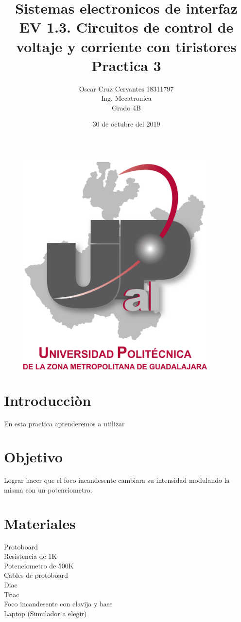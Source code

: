 \documentclass[12pt,a4paper]{article}
\begin{document}
\title{\textbf{Sistemas electronicos de interfaz\\EV 1.3. Circuitos de control de voltaje y corriente con tiristores\\Practica 3}}
\author{Oscar Cruz Cervantes 18311797\\Ing. Mecatronica\\Grado 4B}
\date{30 de octubre del 2019}
\maketitle
\begin{figure}[h!]
\centering
\includegraphics[width=10cm]{UPCDLZMDG5783-logo.png} 
\end{figure}
\newpage

\section{Introducciòn}
En esta practica aprenderemos a utilizar 

\section{Objetivo}
Lograr hacer que el foco incandesente cambiara su intensidad modulando la misma con un potenciometro.

\section{Materiales}
Protoboard\\Resistencia de 1K\\Potenciometro de 500K\\Cables de protoboard\\Diac\\Triac\\Foco incandesente con clavija y base\\Laptop (Simulador a elegir)
\end{document}
